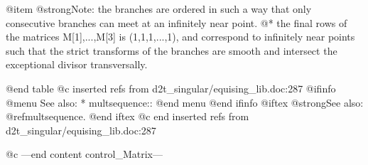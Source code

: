 @item @strong{Note:}
the branches are ordered in such a way that only consecutive branches
can meet at an infinitely near point. @*
the final rows of the matrices M[1],...,M[3] is (1,1,1,...,1), and
correspond to infinitely near points such that the strict transforms
of the branches are smooth and intersect the exceptional divisor
transversally.

@end table
@c inserted refs from d2t_singular/equising_lib.doc:287
@ifinfo
@menu
See also:
* multsequence::
@end menu
@end ifinfo
@iftex
@strong{See also:}
@ref{multsequence}.
@end iftex
@c end inserted refs from d2t_singular/equising_lib.doc:287

@c ---end content control_Matrix---
